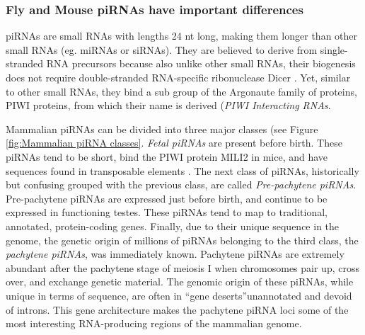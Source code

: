     \subsubsection{Fly and Mouse piRNAs have important differences}

      piRNAs are small RNAs with lengths 24 nt long, making them longer than other small RNAs (eg. miRNAs or siRNAs). They are believed to derive from single-stranded RNA precursors because also unlike other small RNAs, their biogenesis does not require double-stranded RNA-specific ribonuclease Dicer \citep{Vagin2006, Houwing2007}. Yet, similar to other small RNAs, they bind a sub group of the Argonaute family of proteins, PIWI proteins, from which their name is derived (\textit{PIWI Interacting RNAs}. 

      Mammalian piRNAs can be divided into three major classes (see Figure \ref{fig:Mammalian piRNA classes}. \textit{Fetal piRNAs} are present before birth. These piRNAs tend to be short, bind the PIWI protein MILI2 in mice, and have sequences found in transposable elements \citep{Carmell2007}. The next class of piRNAs, historically but confusing grouped with the previous class, are called \textit{Pre-pachytene piRNAs}. Pre-pachytene piRNAs are expressed just before birth, and continue to be expressed in functioning testes. These piRNAs tend to map to traditional, annotated, protein-coding genes. Finally, due to their unique sequence in the genome, the genetic origin of millions of piRNAs belonging to the third class, the \textit{pachytene piRNAs}, was immediately known. Pachytene piRNAs are extremely abundant after the pachytene stage of meiosis I when chromosomes pair up, cross over, and exchange genetic material. The genomic origin of these piRNAs, while unique in terms of sequence, are often in ``gene deserts''\textendash unannotated and devoid of introns. This gene architecture makes the pachytene piRNA loci some of the most interesting RNA-producing regions of the mammalian genome.

